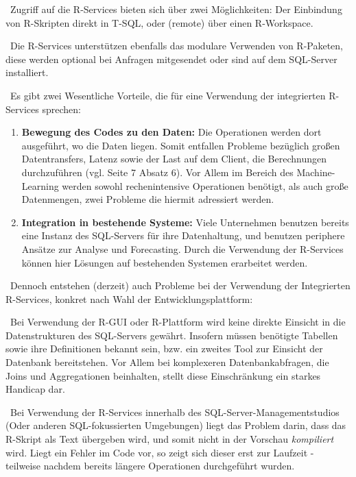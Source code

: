 ~\newline Zugriff auf die R-Services bieten sich über zwei Möglichkeiten: Der Einbindung von R-Skripten direkt in T-SQL, oder (remote) über einen R-Workspace. 

~\newline Die R-Services unterstützen ebenfalls das modulare Verwenden von R-Paketen, diese werden optional bei Anfragen mitgesendet oder sind auf dem SQL-Server installiert. 

~\newline Es gibt zwei Wesentliche Vorteile, die für eine Verwendung der integrierten R-Services sprechen:

\begin{enumerate}
	\item \textbf{Bewegung des Codes zu den Daten:} Die Operationen werden dort ausgeführt, wo die Daten liegen. Somit entfallen Probleme bezüglich großen Datentransfers, Latenz sowie der Last auf dem Client, die Berechnungen durchzuführen (vgl. \cite{SQLData} Seite 7 Absatz 6). Vor Allem im Bereich des Machine-Learning werden sowohl rechenintensive Operationen benötigt, als auch große Datenmengen, zwei Probleme die hiermit adressiert werden. 
	\item \textbf{Integration in bestehende Systeme:} Viele Unternehmen benutzen bereits eine Instanz des SQL-Servers für ihre Datenhaltung, und benutzen periphere Ansätze zur Analyse und Forecasting. Durch die Verwendung der R-Services können hier Lösungen auf bestehenden Systemen erarbeitet werden. 
\end{enumerate}

~\newline Dennoch entstehen (derzeit) auch Probleme bei der Verwendung der Integrierten R-Services, konkret nach Wahl der Entwicklungsplattform: 

~\newline Bei Verwendung der R-GUI oder R-Plattform wird keine direkte Einsicht in die Datenstrukturen des SQL-Servers gewährt. Insofern müssen benötigte Tabellen sowie ihre Definitionen bekannt sein, bzw. ein zweites Tool zur Einsicht der Datenbank bereitstehen. Vor Allem bei komplexeren Datenbankabfragen, die Joins und Aggregationen beinhalten, stellt diese Einschränkung ein starkes Handicap dar. 

~\newline Bei Verwendung der R-Services innerhalb des SQL-Server-Managementstudios (Oder anderen SQL-fokussierten Umgebungen) liegt das Problem darin, dass das R-Skript als Text übergeben wird, und somit nicht in der Vorschau \textit{kompiliert} wird. Liegt ein Fehler im Code vor, so zeigt sich dieser erst zur Laufzeit - teilweise nachdem bereits längere Operationen durchgeführt wurden. 


